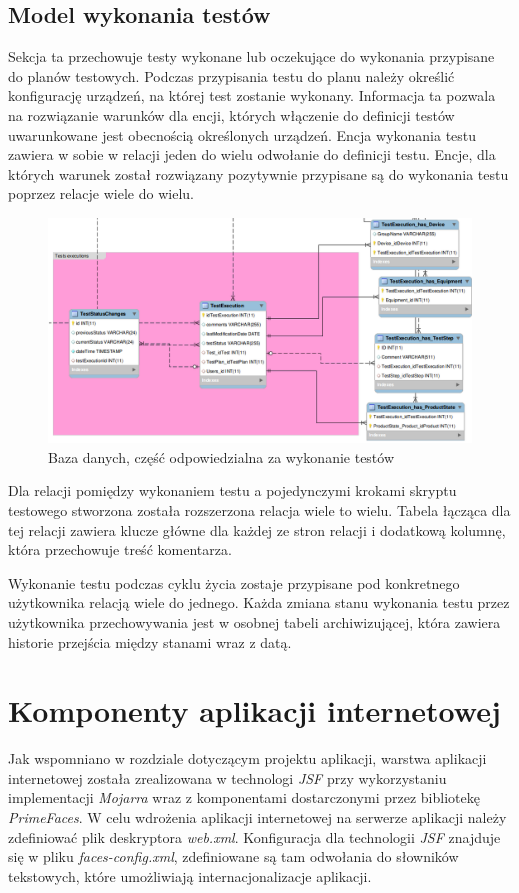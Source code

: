 \subsection{Model wykonania testów} 
Sekcja ta przechowuje testy wykonane lub oczekujące do wykonania przypisane do planów testowych. Podczas przypisania testu do planu należy określić konfigurację urządzeń, na której test zostanie wykonany. Informacja ta pozwala na rozwiązanie warunków dla encji, których włączenie do definicji testów uwarunkowane jest obecnością określonych urządzeń. Encja wykonania testu zawiera w sobie w relacji jeden do wielu odwołanie do definicji testu. Encje, dla których warunek został rozwiązany pozytywnie przypisane są do wykonania testu poprzez relacje wiele do wielu. 
 \begin{figure}[h!]
\centerline{\includegraphics[scale=0.5]{img/bazaDanychWykonanie.png}}
\label{fig:bazaWykonanie}
      \caption{Baza danych, część odpowiedzialna za wykonanie testów}
\end{figure}
Dla relacji pomiędzy wykonaniem testu a pojedynczymi krokami skryptu testowego stworzona została rozszerzona relacja wiele to wielu. Tabela łącząca dla tej relacji zawiera klucze główne dla każdej ze stron relacji i dodatkową kolumnę, która przechowuje treść komentarza.

Wykonanie testu podczas cyklu życia zostaje przypisane pod konkretnego użytkownika relacją wiele do jednego. Każda zmiana stanu wykonania testu przez użytkownika przechowywania jest w osobnej tabeli archiwizującej, która zawiera historie przejścia między stanami wraz z datą.

\section{Komponenty aplikacji internetowej}

Jak wspomniano w rozdziale dotyczącym projektu aplikacji, warstwa aplikacji internetowej została zrealizowana w technologi \textit{JSF} przy wykorzystaniu implementacji \textit{Mojarra} wraz z komponentami dostarczonymi przez bibliotekę \textit{PrimeFaces}.
W celu wdrożenia aplikacji internetowej na serwerze aplikacji należy zdefiniować plik deskryptora \textit{web.xml}. Konfiguracja dla technologii \textit{JSF} znajduje się  w pliku \textit{faces-config.xml}, zdefiniowane są tam odwołania do słowników tekstowych, które umożliwiają internacjonalizacje aplikacji.

